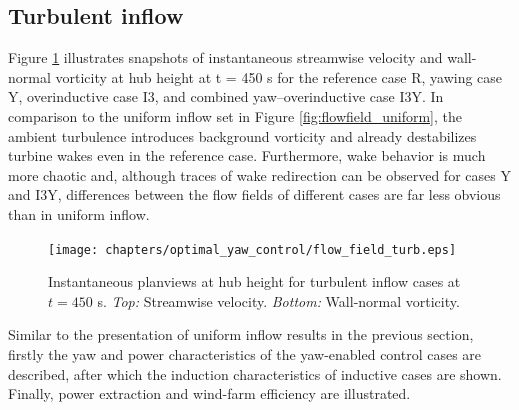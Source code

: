 \subsection{Turbulent inflow}\label{sec:opt_yaw_turb}
	Figure \ref{fig:flowfield_turb} illustrates snapshots of instantaneous streamwise velocity and wall-normal vorticity at hub height at t = 450 s for the reference case R, yawing case Y, overinductive case I3, and combined yaw--overinductive case I3Y. In comparison to the uniform inflow set in Figure \ref{fig:flowfield_uniform}, the ambient turbulence introduces background vorticity and already destabilizes turbine wakes even in the reference case. Furthermore, wake behavior is much more chaotic and, although traces of wake redirection can be observed for cases Y and I3Y, differences between the flow fields of different cases are far less obvious than in uniform inflow. 
	\begin{figure}
		\texttt{[image: chapters/optimal\_yaw\_control/flow\_field\_turb.eps]}
		\caption{Instantaneous planviews at hub height for turbulent inflow cases at $t= 450$ s. \emph{Top: } Streamwise velocity. \emph{Bottom: } Wall-normal vorticity. \label{fig:flowfield_turb}}
	\end{figure}
	
	Similar to the presentation of uniform inflow results in the previous section, firstly the yaw and power characteristics of the yaw-enabled control cases are described, after which the induction characteristics of inductive cases are shown. Finally,  power extraction and wind-farm efficiency are illustrated.
	
